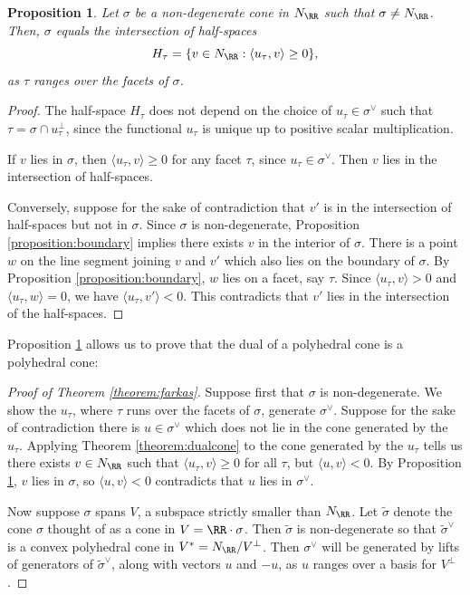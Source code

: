 \documentclass[12pt]{amsart}
\theoremstyle{plain}
\newtheorem{proposition}[theorem]{Proposition}
\begin{document}
\begin{proposition}\label{proposition:dualdescription}
Let $\sigma$ be a non-degenerate cone in $N_\RR$ such that $\sigma \ne N_\RR$.
Then, $\sigma$ equals the intersection of half-spaces
$$H_\tau = \{v \in N_\RR : \langle u_\tau, v\rangle \ge 0\},$$
as $\tau$ ranges over the facets of $\sigma$.
\end{proposition}
\begin{proof}
The half-space $H_\tau$ does not depend on the choice of $u_\tau \in \sigma^\vee$ such that $\tau = \sigma \cap u_\tau^\perp$, since the functional $u_\tau$ is unique up to positive scalar multiplication.

If $v$ lies in $\sigma$, then $\langle u_\tau, v \rangle \ge 0$ for any facet $\tau$, since $u_\tau \in \sigma^\vee$.
Then $v$ lies in the intersection of half-spaces.

Conversely, suppose for the sake of contradiction that $v'$ is in the intersection of half-spaces but not in $\sigma$.
Since $\sigma$ is non-degenerate, Proposition \ref{proposition:boundary} implies there exists $v$ in the interior of $\sigma$.
There is a point $w$ on the line segment joining $v$ and $v'$ which also lies on the boundary of $\sigma$.
By Proposition \ref{proposition:boundary}, $w$ lies on a facet, say $\tau$.
Since $\langle u_\tau, v \rangle > 0$ and $\langle u_\tau, w \rangle = 0$, we have $\langle u_\tau, v' \rangle < 0$.
This contradicts that $v'$ lies in the intersection of the half-spaces.
\end{proof}

Proposition \ref{proposition:dualdescription} allows us to prove that the dual of a polyhedral cone is a polyhedral cone:

\begin{proof}[Proof of Theorem \ref{theorem:farkas}]
Suppose first that $\sigma$ is non-degenerate.
We show the $u_\tau$, where $\tau$ runs over the facets of $\sigma$, generate $\sigma^\vee$.
Suppose for the sake of contradiction there is $u \in \sigma^\vee$ which does not lie in the cone generated by the $u_\tau$.
Applying Theorem \ref{theorem:dualcone} to the cone generated by the $u_\tau$ tells us there exists $v \in N_\RR$ such that $\langle u_\tau, v\rangle \ge 0$ for all $\tau$, but $\langle u, v \rangle < 0$.
By Proposition \ref{proposition:dualdescription}, $v$ lies in $\sigma$, so $\langle u, v \rangle < 0$ contradicts that $u$ lies in $\sigma^\vee$.

Now suppose $\sigma$ spans $V$, a subspace strictly smaller than $N_\RR$.
Let $\tilde \sigma$ denote the cone $\sigma$ thought of as a cone in $V = \RR \cdot \sigma$.
Then $\tilde \sigma$ is non-degenerate so that $\tilde \sigma^\vee$ is a convex polyhedral cone in $V^* = N_\RR / V^\perp$.
Then $\sigma^\vee$ will be generated by lifts of generators of $\tilde \sigma^\vee$, along with vectors $u$ and $-u$, as $u$ ranges over a basis for $V^\perp$.
\end{proof}
\end{document}
